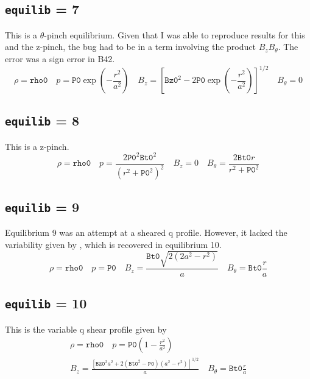 \documentclass[letterpaper]{article}
\newcommand{\ttt}[1]{\texttt{#1}}
\begin{document}
\subsection{\ttt{equilib} = 7}
This is a $\theta$-pinch equilibrium.  Given that I was able to reproduce results for this and the z-pinch, the bug had to be in a term involving the product $B_z B_{\theta}$.  The error was a sign error in B42.
\begin{equation}
\rho=\texttt{rho0} \quad p = \texttt{P0} \exp \left (-\frac{r^2}{a^2} \right ) \quad B_z = \left [\texttt{Bz0}^2 -2\texttt{P0}\exp\left ( -\frac{r^2}{a^2}\right) \right ]^{1/2} \quad B_{\theta}=0
\end{equation}

\subsection{\ttt{equilib} = 8}
This is a z-pinch.
\begin{equation}
\rho=\texttt{rho0} \quad p = \frac{2\texttt{P0}^2\texttt{Bt0}^2}{\left (r^2+\texttt{P0}^2 \right)^2} \quad B_z = 0 \quad B_{\theta}=\frac{2\texttt{Bt0}r}{r^2+\texttt{P0}^2}
\end{equation}

\subsection{\ttt{equilib} = 9}
Equilibrium 9 was an attempt at a sheared q profile.  However, it lacked the variability given by \citet{Chance1977}, which is recovered in equilibrium 10. 
\begin{equation}
\rho=\texttt{rho0} \quad p = \texttt{P0} \quad B_z = \frac{\texttt{Bt0}\sqrt{2(2a^2-r^2)}}{a} \quad B_{\theta}=\texttt{Bt0}\frac{r}{a}
\end{equation}

\subsection{\ttt{equilib} = 10}
This is the variable q shear profile given by \citet{Chance1977} 
\begin{equation}
\begin{array}{c}
\rho=\texttt{rho0} \quad p = \texttt{P0}\left (1-\frac{r^2}{a^2} \right ) \\
B_z = \frac{\left [ \texttt{Bz0}^2 a^2+2(\texttt{Bt0}^2-\texttt{P0})(a^2-r^2)\right ]^{1/2}}{a} \quad B_{\theta}=\texttt{Bt0}\frac{r}{a}
\end{array}
\end{equation}
\end{document}
